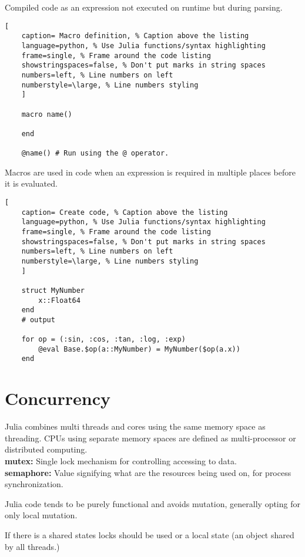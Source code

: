 \documentclass[11pt]{scrartcl} %
\begin{document}
Compiled code as an expression not executed on runtime but during parsing.

\begin{lstlisting}[
	caption= Macro definition, % Caption above the listing
	language=python, % Use Julia functions/syntax highlighting
	frame=single, % Frame around the code listing
	showstringspaces=false, % Don't put marks in string spaces
	numbers=left, % Line numbers on left
	numberstyle=\large, % Line numbers styling
	]

	macro name()

	end

	@name() # Run using the @ operator.

\end{lstlisting}

Macros are used in code when an expression is required in multiple places before it is evaluated.

\begin{lstlisting}[
	caption= Create code, % Caption above the listing
	language=python, % Use Julia functions/syntax highlighting
	frame=single, % Frame around the code listing
	showstringspaces=false, % Don't put marks in string spaces
	numbers=left, % Line numbers on left
	numberstyle=\large, % Line numbers styling
	]

	struct MyNumber
    	x::Float64
	end
	# output

	for op = (:sin, :cos, :tan, :log, :exp)
    	@eval Base.$op(a::MyNumber) = MyNumber($op(a.x))
	end

\end{lstlisting}

\section{Concurrency}

Julia combines multi threads and cores using the same memory space as threading. CPUs using
separate memory spaces are defined as multi-processor or distributed computing.\\

\textbf{mutex:} Single lock mechanism for controlling accessing to data.\\
\textbf{semaphore:} Value signifying what are the resources being used on, for process synchronization.

Julia code tends to be purely functional and avoids mutation, generally opting for only local mutation.

If there is a shared states locks should be used or a local state (an object shared by all threads.)
\end{document}
